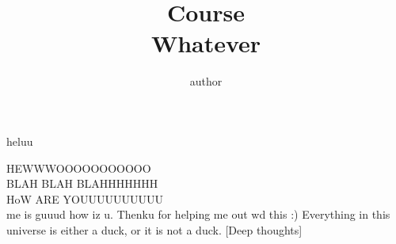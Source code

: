 \documentclass[addpoints]{exam}
\title{Course\\ Whatever}
\author{author}
\begin{document}
\maketitle

\begin{questions}
    \question
     heluu
    \begin{solution}
        HEWWWOOOOOOOOOOO \\ 
        BLAH BLAH BLAHHHHHHH \\ 
        HoW ARE YOUUUUUUUUUU \\
        me is guuud how iz u.
        Thenku for helping me out wd this :)
        Everything in this universe is either a duck, or it is not a duck. [Deep thoughts]
    \end{solution}
    
\end{questions}
\end{document}
